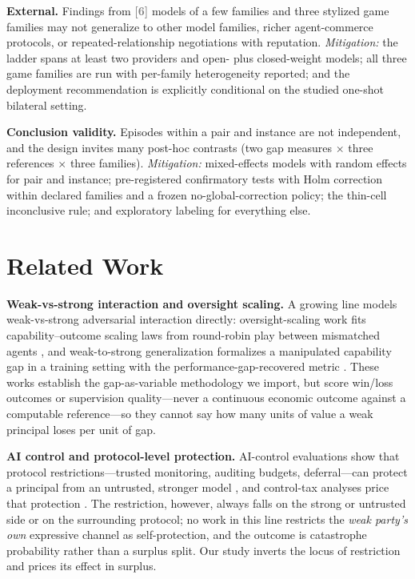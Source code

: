 \documentclass[conference]{IEEEtran}
\newcommand{\ph}[1]{\textcolor{Gray}{\textbf{[#1]}}}
\begin{document}
\textbf{External.} Findings from \ph{6} models of a few families and three stylized game families may not generalize to other model families, richer agent-commerce protocols, or repeated-relationship negotiations with reputation. \emph{Mitigation:} the ladder spans at least two providers and open- plus closed-weight models; all three game families are run with per-family heterogeneity reported; and the deployment recommendation is explicitly conditional on the studied one-shot bilateral setting.

\textbf{Conclusion validity.} Episodes within a pair and instance are not independent, and the design invites many post-hoc contrasts (two gap measures $\times$ three references $\times$ three families). \emph{Mitigation:} mixed-effects models with random effects for pair and instance; pre-registered confirmatory tests with Holm correction within declared families and a frozen no-global-correction policy; the thin-cell inconclusive rule; and exploratory labeling for everything else.

\section{Related Work}
\label{sec:related}

\textbf{Weak-vs-strong interaction and oversight scaling.} A growing line models weak-vs-strong adversarial interaction directly: oversight-scaling work fits capability--outcome scaling laws from round-robin play between mismatched agents \cite{ScalingLawsOversight}, and weak-to-strong generalization formalizes a manipulated capability gap in a training setting with the performance-gap-recovered metric \cite{WeakToStrong}. These works establish the gap-as-variable methodology we import, but score win/loss outcomes or supervision quality---never a continuous economic outcome against a computable reference---so they cannot say how many units of value a weak principal loses per unit of gap.

\textbf{AI control and protocol-level protection.} AI-control evaluations show that protocol restrictions---trusted monitoring, auditing budgets, deferral---can protect a principal from an untrusted, stronger model \cite{AIControl}, and control-tax analyses price that protection \cite{ControlTax}. The restriction, however, always falls on the strong or untrusted side or on the surrounding protocol; no work in this line restricts the \emph{weak party's own} expressive channel as self-protection, and the outcome is catastrophe probability rather than a surplus split. Our study inverts the locus of restriction and prices its effect in surplus.
\end{document}
